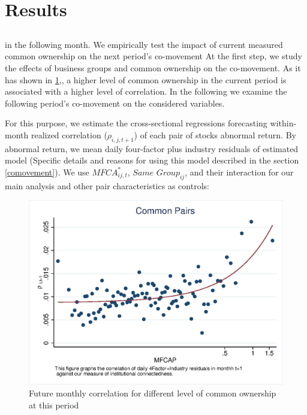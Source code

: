 
\section{Results}



\subsection{}
\label{Forecasting Co-movement}
\begin{LTR}
	in the following month. We empirically test the impact of current measured
	common ownership on the next period’s co-movement
	At the first step, we study the effects of business groups and common ownership on the co-movement. As it has shown in \ref{mcorr50},, a higher level of common	ownership in the current period is associated with a higher level of correlation. In the following we examine the following period's co-movement on the considered variables.
	
	
	For this purpose, we estimate the cross-sectional regressions forecasting within-month realized correlation ($\rho_{i,j,t+1}$) of each pair of stocks abnormal return. By abnormal return, we mean daily four-factor plus industry residuals of estimated model (Specific details and reasons for using this model described in the section \ref{comovement}). We use $\textit{MFCA}^*_{ij,t}$, $\textit{Same Group}_{ij} $, and their interaction for our main analysis and other pair characteristics as controls:
	
	\begin{figure}[htbp]
		\centering  
		\centering
		\includegraphics[width=0.7\linewidth]{"Output/mcorr50.eps"} 
		\caption{Future monthly correlation for different level of common ownership at this period }
		\label{mcorr50}
	\end{figure}
	

\end{LTR}
